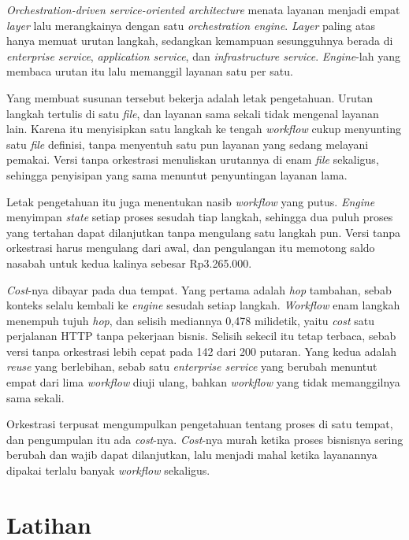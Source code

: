 \textit{Orchestration-driven service-oriented architecture} menata layanan
menjadi empat \textit{layer} lalu merangkainya dengan satu \textit{orchestration
engine}. \textit{Layer} paling atas hanya memuat urutan langkah, sedangkan
kemampuan sesungguhnya berada di \textit{enterprise service},
\textit{application service}, dan \textit{infrastructure service}.
\textit{Engine}-lah yang membaca urutan itu lalu memanggil layanan satu per
satu.

Yang membuat susunan tersebut bekerja adalah letak pengetahuan. Urutan langkah
tertulis di satu \textit{file}, dan layanan sama sekali tidak mengenal layanan lain.
Karena itu menyisipkan satu langkah ke tengah \textit{workflow} cukup menyunting satu
\textit{file} definisi, tanpa menyentuh satu pun layanan yang sedang melayani pemakai.
Versi tanpa orkestrasi menuliskan urutannya di enam \textit{file} sekaligus, sehingga
penyisipan yang sama menuntut penyuntingan layanan lama.

Letak pengetahuan itu juga menentukan nasib \textit{workflow} yang putus. \textit{Engine}
menyimpan \textit{state} setiap proses sesudah tiap langkah, sehingga dua puluh proses
yang tertahan dapat dilanjutkan tanpa mengulang satu langkah pun. Versi tanpa
orkestrasi harus mengulang dari awal, dan pengulangan itu memotong saldo
nasabah untuk kedua kalinya sebesar Rp3.265.000.

\textit{Cost}-nya dibayar pada dua tempat. Yang pertama adalah \textit{hop} tambahan, sebab
konteks selalu kembali ke \textit{engine} sesudah setiap langkah. \textit{Workflow} enam langkah
menempuh tujuh \textit{hop}, dan selisih mediannya 0,478 milidetik, yaitu \textit{cost}
satu perjalanan HTTP tanpa pekerjaan bisnis. Selisih sekecil itu tetap terbaca,
sebab versi tanpa orkestrasi lebih cepat pada 142 dari 200 putaran. Yang kedua
adalah \textit{reuse} yang berlebihan, sebab satu \textit{enterprise service}
yang berubah menuntut empat dari lima \textit{workflow} diuji ulang, bahkan \textit{workflow} yang tidak memanggilnya sama sekali.

Orkestrasi terpusat mengumpulkan pengetahuan tentang proses di satu tempat, dan
pengumpulan itu ada \textit{cost}-nya. \textit{Cost}-nya murah ketika proses bisnisnya sering
berubah dan wajib dapat dilanjutkan, lalu menjadi mahal ketika layanannya
dipakai terlalu banyak \textit{workflow} sekaligus.

\section{Latihan}

